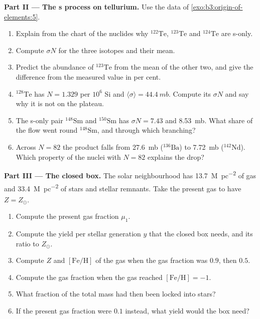\begin{problem}
\medskip\noindent\textbf{Part II --- The s process on tellurium.} Use
the data of \cref{exo:b3:origin-of-elements:5}.
\begin{enumerate}[resume]
\item Explain from the chart of the nuclides why $^{122}\mathrm{Te}$,
  $^{123}\mathrm{Te}$ and $^{124}\mathrm{Te}$ are s-only.
\item Compute $\sigma N$ for the three isotopes and their mean.
\item Predict the abundance of $^{123}\mathrm{Te}$ from the mean of the
  other two, and give the difference from the measured value in per
  cent.
\item $^{128}\mathrm{Te}$ has $N = 1.329$ per $10^6$ Si and
  $\langle\sigma\rangle = \qty{44.4}{mb}$. Compute its $\sigma N$ and
  say why it is not on the plateau.
\item The s-only pair $^{148}\mathrm{Sm}$ and $^{150}\mathrm{Sm}$ has
  $\sigma N = \num{7.43}$ and \qty{8.53}{mb}. What share of the flow
  went round $^{148}\mathrm{Sm}$, and through which branching?
\item Across $N = 82$ the product falls from \qty{27.6}{mb}
  ($^{136}\mathrm{Ba}$) to \qty{7.72}{mb} ($^{142}\mathrm{Nd}$). Which
  property of the nuclei with $N = 82$ explains the drop?
\end{enumerate}

\medskip\noindent\textbf{Part III --- The closed box.} The solar
neighbourhood has \qty{13.7}{M_\odot.pc^{-2}} of gas and
\qty{33.4}{M_\odot.pc^{-2}} of stars and stellar remnants. Take the
present gas to have $Z = Z_\odot$.
\begin{enumerate}[resume]
\item Compute the present gas fraction $\mu_1$.
\item Compute the yield per stellar generation $y$ that the closed box
  needs, and its ratio to $Z_\odot$.
\item Compute $Z$ and $[\mathrm{Fe/H}]$ of the gas when the gas fraction
  was $0.9$, then $0.5$.
\item Compute the gas fraction when the gas reached
  $[\mathrm{Fe/H}] = -1$.
\item What fraction of the total mass had then been locked into stars?
\item If the present gas fraction were $0.1$ instead, what yield would
  the box need?
\end{enumerate}


\end{problem}
